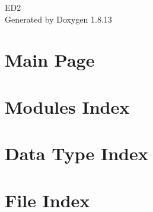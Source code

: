 \documentclass[twoside]{book}
\newcommand{\+}{\discretionary{\mbox{\scriptsize$\hookleftarrow$}}{}{}}
\newcommand{\clearemptydoublepage}{%
  \newpage{\pagestyle{empty}\cleardoublepage}%
}
\begin{document}
\hypersetup{pageanchor=false,
             bookmarksnumbered=true,
             pdfencoding=unicode
            }
\begin{titlepage}
\vspace*{7cm}
\begin{center}%
{\Large E\+D2 }\\
\vspace*{1cm}
{\large Generated by Doxygen 1.8.13}\\
\end{center}
\end{titlepage}
\clearemptydoublepage
{}
\tableofcontents
\clearemptydoublepage
{}
\hypersetup{pageanchor=true}

\chapter{Main Page}
\label{index}\hypertarget{index}{}
\chapter{Modules Index}

\chapter{Data Type Index}

\chapter{File Index}

\end{document}
